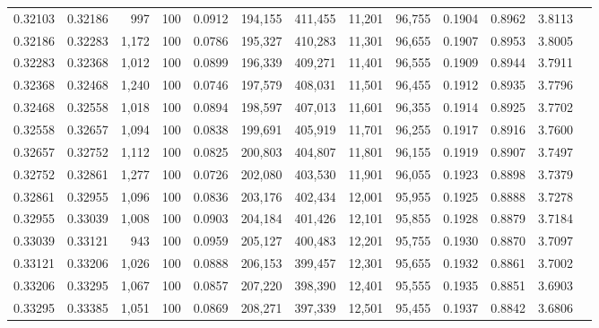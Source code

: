 \begin{tabular}{rrrrrrrrrrrrr}
0.32103 & 0.32186 &   997 & 100 &                                     0.0912 & 194,155 & 411,455 &  11,201 &  96,755 & 0.1904 & 0.8962 & 3.8113 \\
0.32186 & 0.32283 & 1,172 & 100 &                                     0.0786 & 195,327 & 410,283 &  11,301 &  96,655 & 0.1907 & 0.8953 & 3.8005 \\
0.32283 & 0.32368 & 1,012 & 100 &                                     0.0899 & 196,339 & 409,271 &  11,401 &  96,555 & 0.1909 & 0.8944 & 3.7911 \\
0.32368 & 0.32468 & 1,240 & 100 &                                     0.0746 & 197,579 & 408,031 &  11,501 &  96,455 & 0.1912 & 0.8935 & 3.7796 \\
0.32468 & 0.32558 & 1,018 & 100 &                                     0.0894 & 198,597 & 407,013 &  11,601 &  96,355 & 0.1914 & 0.8925 & 3.7702 \\
0.32558 & 0.32657 & 1,094 & 100 &                                     0.0838 & 199,691 & 405,919 &  11,701 &  96,255 & 0.1917 & 0.8916 & 3.7600 \\
0.32657 & 0.32752 & 1,112 & 100 &                                     0.0825 & 200,803 & 404,807 &  11,801 &  96,155 & 0.1919 & 0.8907 & 3.7497 \\
0.32752 & 0.32861 & 1,277 & 100 &                                     0.0726 & 202,080 & 403,530 &  11,901 &  96,055 & 0.1923 & 0.8898 & 3.7379 \\
0.32861 & 0.32955 & 1,096 & 100 &                                     0.0836 & 203,176 & 402,434 &  12,001 &  95,955 & 0.1925 & 0.8888 & 3.7278 \\
0.32955 & 0.33039 & 1,008 & 100 &                                     0.0903 & 204,184 & 401,426 &  12,101 &  95,855 & 0.1928 & 0.8879 & 3.7184 \\
0.33039 & 0.33121 &   943 & 100 &                                     0.0959 & 205,127 & 400,483 &  12,201 &  95,755 & 0.1930 & 0.8870 & 3.7097 \\
0.33121 & 0.33206 & 1,026 & 100 &                                     0.0888 & 206,153 & 399,457 &  12,301 &  95,655 & 0.1932 & 0.8861 & 3.7002 \\
0.33206 & 0.33295 & 1,067 & 100 &                                     0.0857 & 207,220 & 398,390 &  12,401 &  95,555 & 0.1935 & 0.8851 & 3.6903 \\
0.33295 & 0.33385 & 1,051 & 100 &                                     0.0869 & 208,271 & 397,339 &  12,501 &  95,455 & 0.1937 & 0.8842 & 3.6806 \\

\end{tabular}
